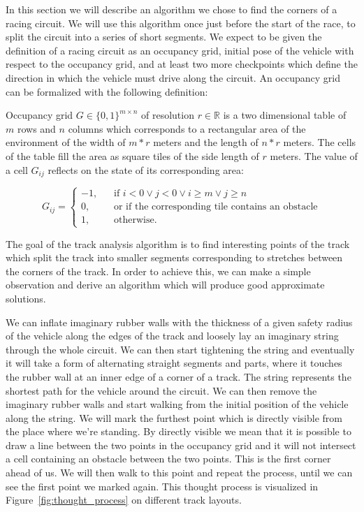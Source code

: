 In this section we will describe an algorithm we chose to find the corners of a racing circuit. We will use this algorithm once just before the start of the race, to split the circuit into a series of short segments. We expect to be given the definition of a racing circuit as an occupancy grid, initial pose of the vehicle with respect to the occupancy grid, and at least two more checkpoints which define the direction in which the vehicle must drive along the circuit. An occupancy grid can be formalized with the following definition:

\begin{defn}\label{def:occupancy_grid}
	Occupancy grid $G\in\{0, 1\}^{m\times n}$ of resolution $r\in\mathbb{R}$ is a two dimensional table of $m$ rows and $n$ columns which corresponds to a rectangular area of the environment of the width of $m * r$ meters and the length of $n * r$ meters. The cells of the table fill the area as square tiles of the side length of $r$ meters. The value of a cell $G_{ij}$ reflects on the state of its corresponding area:
	
	\[
	G_{ij} =
	\begin{cases}
	-1\text{,} &\quad\text{if } i < 0 \vee j < 0 \vee i \geq m \vee j \geq n\\
	0\text{,} &\quad\text{or if the corresponding tile contains an obstacle} \\
	1\text{,} &\quad\text{otherwise.}
	\end{cases}
	\]
\end{defn}

The goal of the track analysis algorithm is to find interesting points of the track which split the track into smaller segments corresponding to stretches between the corners of the track. In order to achieve this, we can make a simple observation and derive an algorithm which will produce good approximate solutions.

We can inflate imaginary rubber walls with the thickness of a given safety radius of the vehicle along the edges of the track and loosely lay an imaginary string through the whole circuit. We can then start tightening the string and eventually it will take a form of alternating straight segments and parts, where it touches the rubber wall at an inner edge of a corner of a track. The string represents the shortest path for the vehicle around the circuit. We can then remove the imaginary rubber walls and start walking from the initial position of the vehicle along the string. We will mark the furthest point which is directly visible from the place where we're standing. By directly visible we mean that it is possible to draw a line between the two points in the occupancy grid and it will not intersect a cell containing an obstacle between the two points. This is the first corner ahead of us. We will then walk to this point and repeat the process, until we can see the first point we marked again. This thought process is visualized in Figure~\ref{fig:thought_process} on different track layouts.

